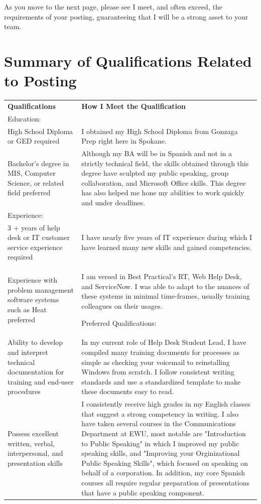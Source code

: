 \documentclass[a4paper,10pt]{article}
\begin{document}
\par
As you move to the next page, please see I meet, and often exceed, the requirements of your posting, guaranteeing that I will be a strong asset to your team.\\
\pagebreak
\section{Summary of Qualifications Related to Posting}
\begin{longtable}{|p{.35\linewidth}|p{.6\linewidth}|}
	\textbf{Qualifications} & \textbf{How I Meet the Qualification}\\
  Education: & \\
High School Diploma or GED required & I obtained my High School Diploma from Gonzaga Prep right here in Spokane.\\

Bachelor’s degree in MIS, Computer Science, or related field preferred & Although my BA will be in Spanish and not in a strictly technical field, the skills obtained through this degree have sculpted my public speaking, group collaboration, and Microsoft Office skills. This degree has also helped me hone my abilities to work quickly and under deadlines.\\

Experience: & \\
3 + years of help desk or IT customer service experience required & I have nearly five years of IT experience during which I have learned many new skills and gained competencies.\\
Experience with problem management software systems such as Heat preferred & I am versed in Best Practical's RT, Web Help Desk, and ServiceNow. I was able to adapt to the nuances of these systems in minimal time-frames, usually training colleagues on their usages.


Preferred Qualifications: & \\
Ability to develop and interpret technical documentation for training and end-user procedures
& In my current role of Help Desk Student Lead, I have compiled many training documents for processes as simple as checking your voicemail to reinstalling Windows from scratch. I follow consistent writing standards and use a standardized template to make these documents easy to read.\\

Possess excellent written, verbal, interpersonal, and presentation skills
& I consistently receive high grades in my English classes that suggest a strong competency in writing. I also have taken several courses in the Communications Department at EWU, most notable are "Introduction to Public Speaking" in which I improved my public speaking skills, and "Improving your Orginizational Public Speaking Skills", which focused on speaking on behalf of a corporation. In addition, my core Spanish courses all require regular preparation of presentations that have a public speaking component. \\


\end{longtable}
\end{document}
